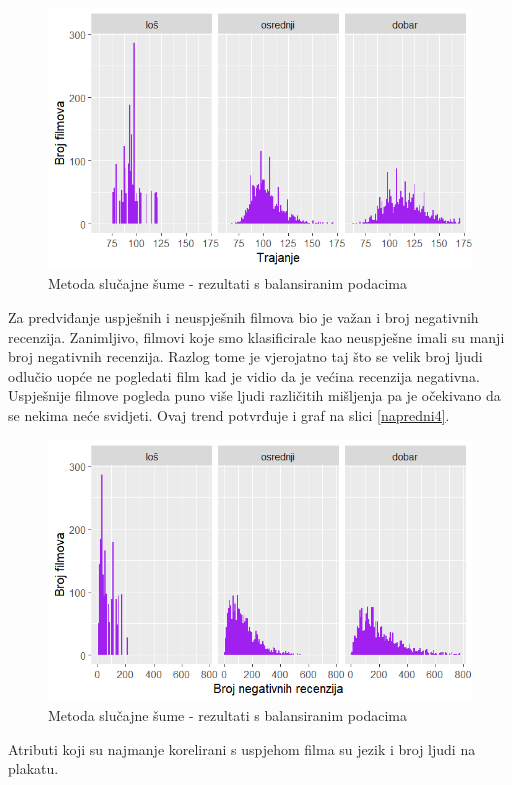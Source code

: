\begin{figure}[H]
	\centering
	\includegraphics[width=15cm]{../figures/expl/007.png}
	\caption{Metoda slučajne šume - rezultati s balansiranim podacima}
	\label{fig:ml7}
\end{figure}

Za predviđanje uspješnih i neuspješnih filmova bio je važan i broj negativnih recenzija. Zanimljivo, filmovi koje smo klasificirale kao neuspješne imali su manji broj negativnih recenzija. Razlog tome je vjerojatno taj što se velik broj ljudi odlučio uopće ne pogledati film kad je vidio da je većina recenzija negativna. Uspješnije filmove pogleda puno više ljudi različitih mišljenja pa je očekivano da se nekima neće svidjeti. Ovaj trend potvrđuje i graf na slici \ref{napredni4}.

\begin{figure}[H]
	\centering
	\includegraphics[width=15cm]{../figures/expl/008.png}
	\caption{Metoda slučajne šume - rezultati s balansiranim podacima}
	\label{fig:ml8}
\end{figure}

Atributi koji su najmanje korelirani s uspjehom filma su jezik i broj ljudi na plakatu.

\eject